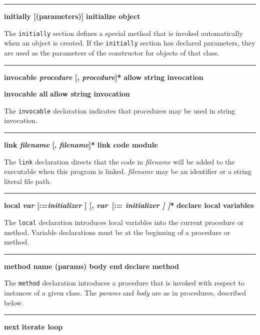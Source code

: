 \bigskip\hrule\vspace{0.1cm}
\noindent
{\bf \textbf{initially} [(parameters)] } \hfill {\bf initialize object}

\noindent
{}The \texttt{initially} section defines a special method
that is invoked automatically when an object is created. If the
\texttt{initially} section has declared parameters, they are used as
the parameters of the constructor for objects
of that class.

\bigskip\hrule\vspace{0.1cm}
\noindent
{\bf \textbf{invocable} \textit{procedure} [, \textit{procedure}]* } \hfill {\bf allow string invocation}

\noindent
{}
{\textbf{invocable all} } \hfill {\bf allow string invocation}

\noindent
The \texttt{invocable} declaration indicates that procedures may be used
in string invocation.

\bigskip\hrule\vspace{0.1cm}
\noindent
{\bf \textbf{link} \textit{filename} [, \textit{filename}]* } \hfill {\bf link code module}

\noindent
The \texttt{link} declaration directs that the code in
\textit{filename} will be added to the executable when this program is
linked. \textit{filename} may be an identifier or a string literal file
path.

\bigskip\hrule\vspace{0.1cm}
\noindent
{\bf \textbf{local} \textit{var} [:=\textit{initializer} ] [, \textit{var}\ [:=\textit{ initializer ] ]}* } \hfill {\bf declare local variables}

\noindent
{}The \texttt{local} declaration introduces local
variables into the current procedure or method.
Variable declarations must be at the beginning of a
procedure or method.

\bigskip\hrule\vspace{0.1cm}
\noindent
{\bf method name (params) body end } \hfill {\bf declare method}

\noindent
{}The \texttt{method} declaration introduces a procedure
that is invoked with respect to instances of
a given class. The \textit{params} and \textit{body}
are as in procedures, described below.

\bigskip\hrule\vspace{0.1cm}
\noindent
{\bf next } \hfill {\bf iterate loop}


